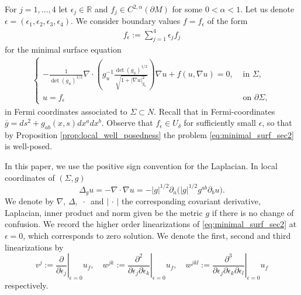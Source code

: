 \documentclass[12pt]{amsart}
\def\p{\partial}
\def\R{\mathbb R}
\theoremstyle{definition}
\theoremstyle{remark}
\newcommand{\abs}[1]{\lvert #1 \rvert}
\newcommand{\eps}{\epsilon}
\newcommand{\ccdot}{\,\cdot\,}
\begin{document}
For $j=1,\ldots,4$ let $\eps_j\in \R$ and $f_j\in C^{2,\alpha}(\p M)$ for some $0<\alpha<1$. Let us denote $\eps=(\eps_1,\eps_2,\eps_3,\eps_4)$. We consider boundary values $f=f_\eps$  of the form 
\begin{align}\label{f_epsilon}
	f_\eps:=\displaystyle \sum_{j=1}^4\eps_j f_j%
\end{align}
for the minimal surface equation
\begin{equation}\label{eq:minimal_surf_sec2}
\begin{aligned}
\begin{cases}
 -\frac{1}{\det(g_u)^{1/2}}\nabla\cdot \left( g_u^{-1}\frac{\det(g_u)^{1/2}}{\sqrt{1+\abs{\nabla u}^2_{g_u}}} \right)\nabla u + f(u,\nabla u) =0, 
&\text{ in } \Sigma,
\\
u= f_\eps 
&\text{ on }\p \Sigma,
\end{cases}
    \end{aligned}
\end{equation}
in Fermi coordinates associated to $\Sigma\subset N$. Recall that in Fermi-coordinates $\overline g=ds^2 +g_{ab}(x,s)dx^adx^b$. 
Observe that $f_\eps \in U_\delta$ for sufficiently small $\epsilon$, so that by Proposition \ref{prop:local_well_posedness} the problem \eqref{eq:minimal_surf_sec2} is well-posed.

In this paper, we use the positive sign convention for the Laplacian. In local coordinates of $(\Sigma,g)$
\[
 \Delta_g u=-\nabla\cdot\nabla u= -\abs{g}^{1/2}\p_a\big(\abs{g}^{1/2}g^{ab}\p_b u\big).
\]
We denote by $\nabla$, $\Delta$, $\ccdot$ and $\abs{\ccdot}$ the corresponding covariant derivative, Laplacian, inner product and norm given be the metric $g$ if there is no change of confusion. We record the higher order linearizations of \eqref{eq:minimal_surf_sec2} at $\eps=0$, which corresponds to zero solution. We denote the first, second and third linearizations by
\begin{equation}\label{eq:not_for_lins}
 v^{j}:= \left.\frac{\p}{\p\epsilon_j}\right|_{\eps=0} u_f, \quad w^{jk}:= \left.\frac{\p^2}{\p\epsilon_j\p\epsilon_k}\right|_{\eps=0} u_f, \quad w^{jkl}:= \left.\frac{\p^3}{\p\epsilon_j\p\epsilon_k\p\epsilon_l}\right|_{\eps=0} u_f
\end{equation}
respectively. 
\end{document}
